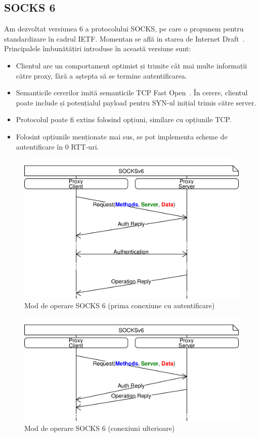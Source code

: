 \subsection{SOCKS 6}

Am dezvoltat versiunea 6 a protocolului SOCKS, pe care o propunem
pentru standardizare în cadrul IETF. Momentan se află in starea de
Internet Draft~\cite{socks6}.  Principalele îmbunătățiri introduse în
această versiune sunt:
\begin{itemize}
	\item Clientul are un comportament optimist și trimite cât mai multe informații către proxy, fără a aștepta să se termine autentificarea.
	\item Semanticile cererilor imită semanticile TCP Fast Open~\cite{rfc7413}. În cerere, clientul poate include și potențialul payload pentru SYN-ul inițial trimis către server.
	\item Protocolul poate fi extins folosind opțiuni, similare cu opțiunile TCP.
	\item Folosint opțiunile menționate mai sus, se pot implementa scheme de autentificare în 0 RTT-uri.
\end{itemize}


\begin{figure}[h]
	\centering
	\includegraphics[scale=0.7]{figures/socks/socks6op1st.png}
	\caption{Mod de operare SOCKS 6 (prima conexiune cu autentificare)}
    	\label{fig:socks6op1st}
\end{figure}

\begin{figure}[h]
	\centering
	\includegraphics[scale=0.7]{figures/socks/socks6op2nd.png}
	\caption{Mod de operare SOCKS 6 (conexiuni ulterioare)}
    	\label{fig:socks6op2nd}
\end{figure}

